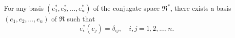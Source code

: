 For any basis $(e_1^*, e_2^*, \dots, e_n^*)$ of the conjugate space $\mathfrak{R}^*$, there exists a basis $(e_1, e_2, \dots, e_n)$ of $\mathfrak{R}$ such that
$$
e_i^*(e_j) = \delta_{ij}, \quad i, j = 1, 2, \dots, n.
$$
